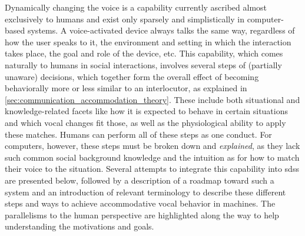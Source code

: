 Dynamically changing the voice is a capability currently ascribed almost exclusively to humans and exist only sparsely and simplistically in computer-based systems.
A voice-activated device always talks the same way, regardless of how the user speaks to it, the environment and setting in which the interaction takes place, the goal and role of the device, etc.
This capability, which comes naturally to humans in social interactions, involves several steps of (partially unaware) decisions, which together form the overall effect of becoming behaviorally more or less similar to an interlocutor, as explained in \cref{sec:communication_accommodation_theory}.
These include both situational and knowledge-related facets like how it is expected to behave in certain situations and which vocal changes fit those, as well as the physiological ability to apply these matches.
Humans can perform all of these steps as one conduct.
For computers, however, these steps must be broken down and \emph{explained}, as they lack such common social background knowledge and the intuition as for how to match their voice to the situation.
Several attempts to integrate this capability into \acp{sds} are presented below, followed by a description of a roadmap toward such a system and an introduction of relevant terminology to describe these different steps and ways to achieve accommodative vocal behavior in machines.
The parallelisms to the human perspective are highlighted along the way to help understanding the motivations and goals.

